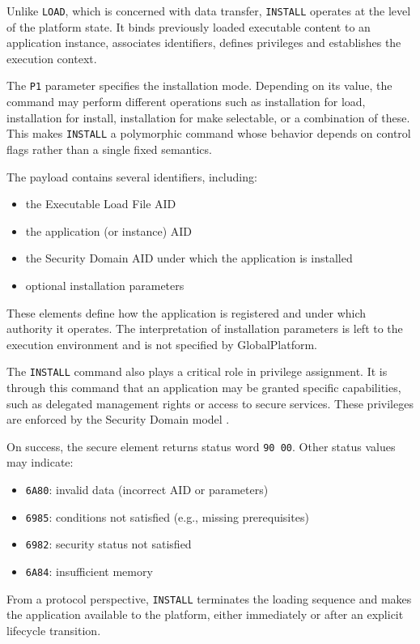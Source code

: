 Unlike \texttt{LOAD}, which is concerned with data transfer, \texttt{INSTALL}
operates at the level of the platform state. It binds previously loaded
executable content to an application instance, associates identifiers, defines
privileges and establishes the execution context.

The \texttt{P1} parameter specifies the installation mode. Depending on its
value, the command may perform different operations such as installation for
load, installation for install, installation for make selectable, or a
combination of these. This makes \texttt{INSTALL} a polymorphic command whose
behavior depends on control flags rather than a single fixed semantics.

The payload contains several identifiers, including:
\begin{itemize}
\item the Executable Load File AID
\item the application (or instance) AID
\item the Security Domain AID under which the application is installed
\item optional installation parameters
\end{itemize}

These elements define how the application is registered and under which
authority it operates. The interpretation of installation parameters is left to
the execution environment and is not specified by GlobalPlatform.

The \texttt{INSTALL} command also plays a critical role in privilege
assignment. It is through this command that an application may be granted
specific capabilities, such as delegated management rights or access to secure
services. These privileges are enforced by the Security Domain model
.

On success, the secure element returns status word \texttt{90 00}. Other status values
may indicate:
\begin{itemize}
\item \texttt{6A80}: invalid data (incorrect AID or parameters)
\item \texttt{6985}: conditions not satisfied (e.g., missing prerequisites)
\item \texttt{6982}: security status not satisfied
\item \texttt{6A84}: insufficient memory
\end{itemize}

From a protocol perspective, \texttt{INSTALL} terminates the loading sequence
and makes the application available to the platform, either immediately or
after an explicit lifecycle transition.


